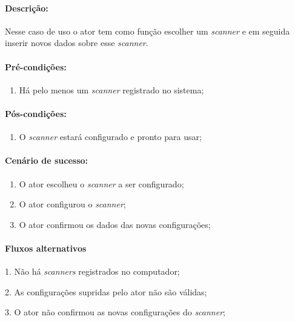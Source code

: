 \paragraph{Descrição:} Nesse caso de uso o ator tem como função escolher um {\it scanner} e em seguida inserir novos dados sobre esse {\it scanner}.

\paragraph{Pré-condições:}
\begin{enumerate}
    \item Há pelo menos um {\it scanner} registrado no sistema;
\end{enumerate}

\paragraph{Pós-condições:} 
\begin{enumerate}
    \item O {\it scanner} estará configurado e pronto para usar;
\end{enumerate}

\paragraph{Cenário de sucesso:}
\begin{enumerate}
    \item O ator escolheu o  {\it scanner} a ser configurado;
    \item O ator configurou o {\it scanner};
    \item O ator confirmou os dados das novas configurações;
\end{enumerate}

\paragraph{Fluxos alternativos}
\begin{description}
    \item 1. Não há {\it scanners} registrados no computador;
    \item 2. As configurações supridas pelo ator não são válidas; 
    \item 3. O ator não confirmou as novas configurações do {\it scanner};
\end{description}


